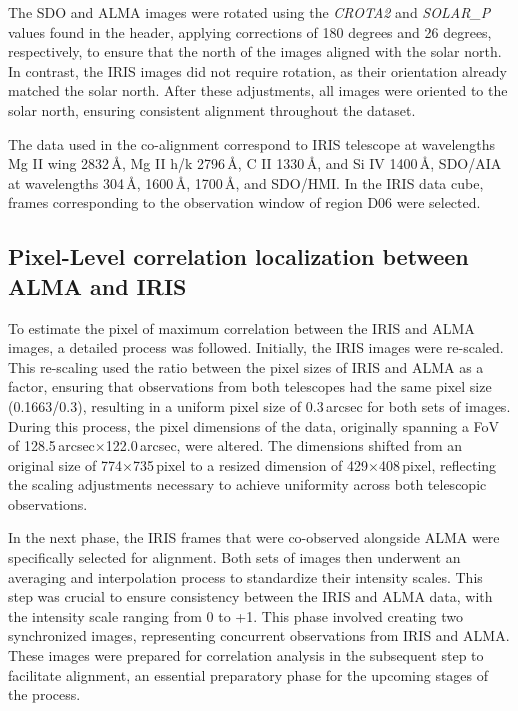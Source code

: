 \documentclass[a4paper,alpha-refs]{eSpectra}
\begin{document}
The SDO and ALMA images were rotated using the \textit{CROTA2} \cite[See Table 1,][]{brown_working_nodate}
and \textit{SOLAR\_P} \cite[See Table A.2,][]{SALSA_guia}
values found in the header, applying corrections of 180 degrees and 26 degrees, respectively, to ensure that the north of the images aligned with the solar north. 
In contrast, the IRIS images did not require rotation, as their orientation already matched the solar north. After these adjustments, all images were oriented to the solar north, ensuring consistent alignment throughout the dataset.

The data used in the co-alignment correspond to  IRIS telescope at wavelengths Mg II wing 2832\,Å, Mg II h/k 2796\,Å, C II 1330\,Å, and Si IV 1400\,Å, SDO/AIA at wavelengths 304\,Å, 1600\,Å, 1700\,Å,  and  SDO/HMI. In the IRIS data cube, frames corresponding to the observation window of region D06 were selected.



\subsection{Pixel-Level correlation localization between ALMA and IRIS}
\label{alma-IRIS_correlation_process}

To estimate the pixel of maximum correlation between the IRIS and ALMA images, a detailed process was followed. Initially, the IRIS images were re-scaled. This re-scaling used the ratio between the pixel sizes of IRIS and ALMA as a factor, ensuring that observations from both telescopes had the same pixel size (0.1663/0.3), resulting in a uniform pixel size of 0.3\,arcsec for both sets of images. During this process, the pixel dimensions of the data, originally spanning a FoV of 128.5\,arcsec$\times$122.0\,arcsec, were altered. The dimensions shifted from an original size of 774$\times$735\,pixel to a resized dimension of 429$\times$408\,pixel, reflecting the scaling adjustments necessary to achieve uniformity across both telescopic observations.

In the next phase, the IRIS frames that were co-observed alongside ALMA were specifically selected for alignment. Both sets of images then underwent an averaging and interpolation process to standardize their intensity scales. 
This step was crucial to ensure consistency between the IRIS and ALMA data, with the intensity scale ranging from 0 to +1. 
This phase involved creating two synchronized images, representing concurrent observations from IRIS and ALMA. These images were prepared for correlation analysis in the subsequent step to facilitate alignment, an essential preparatory phase for the upcoming stages of the process.
\end{document}
